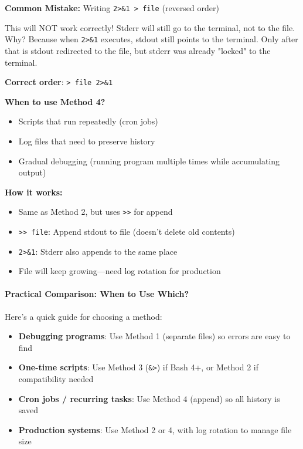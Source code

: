 \begin{warningbox}
	\textbf{Common Mistake:} Writing \texttt{2>\&1 > file} (reversed order)

	This will NOT work correctly! Stderr will still go to the terminal, not to the file. Why? Because when \texttt{2>\&1} executes, stdout still points to the terminal. Only after that is stdout redirected to the file, but stderr was already "locked" to the terminal.

	\textbf{Correct order}: \texttt{> file 2>\&1}

\end{warningbox}
\textbf{When to use Method 4?}
\begin{itemize}
	\item Scripts that run repeatedly (cron jobs)
	\item Log files that need to preserve history
	\item Gradual debugging (running program multiple times while accumulating output)
\end{itemize}

\textbf{How it works:}
\begin{itemize}
	\item Same as Method 2, but uses \texttt{>>} for append
	\item \texttt{>> file}: Append stdout to file (doesn't delete old contents)
	\item \texttt{2>\&1}: Stderr also appends to the same place
	\item File will keep growing---need log rotation for production
\end{itemize}

\paragraph{Practical Comparison: When to Use Which?}

Here's a quick guide for choosing a method:

\begin{itemize}
	\item \textbf{Debugging programs}: Use Method 1 (separate files) so errors are easy to find
	\item \textbf{One-time scripts}: Use Method 3 (\texttt{\&>}) if Bash 4+, or Method 2 if compatibility needed
	\item \textbf{Cron jobs / recurring tasks}: Use Method 4 (append) so all history is saved
	\item \textbf{Production systems}: Use Method 2 or 4, with log rotation to manage file size
\end{itemize}

